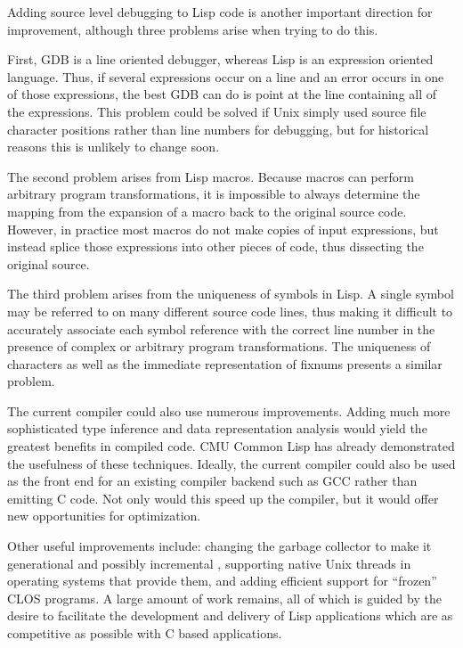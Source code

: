 Adding source level debugging to Lisp code is another important
direction for improvement, although three problems arise when
trying to do this.

First, GDB is a line oriented debugger, whereas Lisp is an expression
oriented language. Thus, if several expressions occur on a line and an
error occurs in one of those expressions, the best GDB can do is point
at the line containing all of the expressions.  This problem could be
solved if Unix simply used source file character positions rather than
line numbers for debugging, but for historical reasons this is
unlikely to change soon.

The second problem arises from Lisp macros. Because macros can perform
arbitrary program transformations, it is impossible to always determine the
mapping from the expansion of a macro back to the original source
code. However, in practice most macros do not make copies of input
expressions, but instead splice those expressions into other pieces of
code, thus dissecting the original source.  

The third problem arises from the uniqueness of symbols in Lisp.  A
single symbol may be referred to on many different source code lines,
thus making it difficult to accurately associate each symbol reference
with the correct line number in the presence of complex or arbitrary
program transformations.  The uniqueness of characters as well as the
immediate representation of fixnums presents a similar problem.

The current compiler could also use numerous improvements. Adding much
more sophisticated type inference and data representation analysis
would yield the greatest benefits in compiled code. CMU Common Lisp
\cite{cmu-lisp} has already demonstrated the usefulness of these
techniques. Ideally, the current compiler could also be used as the
front end for an existing compiler backend such as GCC rather than
emitting C code. Not only would this speed up the
compiler, but it would offer new opportunities for optimization.

Other useful improvements include: changing the garbage collector to
make it generational \cite{gc2} and possibly incremental \cite{gc3},
supporting native Unix threads in operating systems that provide them,
and adding efficient support for ``frozen'' CLOS programs.  A large
amount of work remains, all of which is guided by the desire to
facilitate the development and delivery of Lisp applications which are
as competitive as possible with C based applications.

